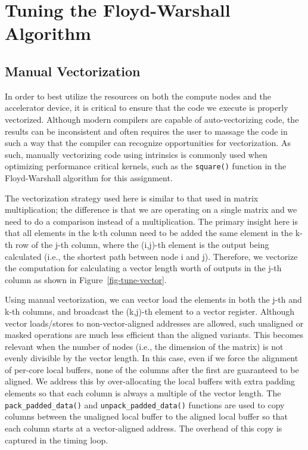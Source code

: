 
\section{Tuning the Floyd-Warshall Algorithm}
\label{sec-tune}

\subsection{Manual Vectorization}
\label{sec-tune-vector}

In order to best utilize the resources on both the compute nodes and the
accelerator device, it is critical to ensure that the code we execute is
properly vectorized. Although modern compilers are capable of
auto-vectorizing code, the results can be inconsistent and often requires
the user to massage the code in such a way that the compiler can
recognize opportunities for vectorization. As such, manually vectorizing
code using intrinsics is commonly used when optimizing performance
critical kernels, such as the \texttt{square()} function in the
Floyd-Warshall algorithm for this assignment.

The vectorization strategy used here is similar to that used in matrix
multiplication; the difference is that we are operating on a single
matrix and we need to do a comparison instead of a multiplication. The
primary insight here is that all elements in the k-th column need to be
added the same element in the k-th row of the j-th column, where
the (i,j)-th element is the output being calculated (i.e., the shortest
path between node i and j). Therefore, we vectorize the computation for
calculating a vector length worth of outputs in the j-th column as shown
in Figure~\ref{fig-tune-vector}.

Using manual vectorization, we can vector load the elements in both the
j-th and k-th columns, and broadcast the (k,j)-th element to a vector
register. Although vector loads/stores to non-vector-aligned addresses are
allowed, such unaligned or masked operations are much less efficient
than the aligned variants. This becomes relevant when the number of nodes
(i.e., the dimension of the matrix) is not evenly divisible by the vector
length. In this case, even if we force the alignment of per-core local
buffers, none of the columns after the first are guaranteed to be
aligned. We address this by over-allocating the local buffers with extra
padding elements so that each column is always a multiple of the vector
length. The \texttt{pack\_padded\_data()} and
\texttt{unpack\_padded\_data()} functions are used to copy columns
between the unaligned local buffer to the aligned local buffer so that
each column starts at a vector-aligned address. The overhead of this copy
is captured in the timing loop.

